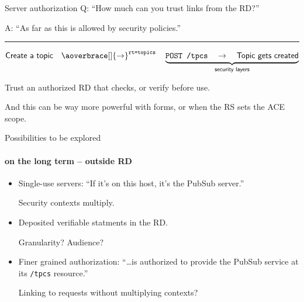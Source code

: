 \documentclass[aspectratio=169]{beamer}
\begin{document}
\begin{frame}{Server authorization}\Large
	Q: “How much can you trust links from the RD?”

	\bigskip

	A: “As far as this is allowed by security policies.”

	\vspace{1cm}
	\pause
	\hrule
	\vspace{1cm}

	\pause
	\vspace{-1cm}

	$\textsf{Create a topic} \quad\aoverbrace[]{\rightarrow}^{\texttt{rt=topics}}\quad \underbrace{\texttt{POST /tpcs} \quad\rightarrow\quad \textsf{Topic gets created}}_{\textsf{security layers}}$

	\bigskip

	Trust an authorized RD that checks, or verify before use.

	\bigskip

	\footnotesize And this can be way more powerful with forms, or when the RS sets the ACE scope.
\end{frame}

\begin{frame}{Possibilities to be explored}\Large
	\framesubtitle{on the long term -- outside RD}

	\begin{itemize}
		\item Single-use servers: “If it's on this host, it's the PubSub server.”

			Security contexts multiply.

			\bigskip

		\item Deposited verifiable statments in the RD.

			Granularity? Audience?

			\bigskip

		\item Finer grained authorization: “\ldots is authorized to provide the PubSub service at its \texttt{/tpcs} resource.”

			Linking to requests without multiplying contexts?
	\end{itemize}
\end{frame}
\end{document}
